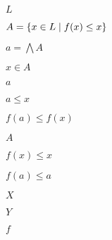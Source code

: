 \documentclass[10pt]{book}
\begin{document}
\begin{mdSnippets}
\begin{mdInlineSnippet}%
$L$\end{mdInlineSnippet}%
\begin{mdInlineSnippet}[a517cb183841eeec037a91ab4d1cf7f8]%
$A = \{x \in L \mid f(x) \leq x\}$\end{mdInlineSnippet}%
\begin{mdInlineSnippet}[a0248c5ed4fcf8c8688b4867ba675f8f]%
$a = \bigwedge A$\end{mdInlineSnippet}%
\begin{mdInlineSnippet}[15ba9457f86ec9a30bc9c1186628cce1]%
$x \in A$\end{mdInlineSnippet}%
\begin{mdInlineSnippet}[0cc175b9c0f1b6a831c399e269772661]%
$a$\end{mdInlineSnippet}%
\begin{mdInlineSnippet}[dea31c0ee5c3ad900ed1ee8811a0413d]%
$a \leq x$\end{mdInlineSnippet}%
\begin{mdInlineSnippet}[f9e1ab92d69f99be96ff37ad147f13ba]%
$f(a) \leq f(x)$\end{mdInlineSnippet}%
\begin{mdInlineSnippet}[7fc56270e7a70fa81a5935b72eacbe29]%
$A$\end{mdInlineSnippet}%
\begin{mdInlineSnippet}[63362f83cf87ffffbf28ae813d6d144d]%
$f(x) \leq x$\end{mdInlineSnippet}%
\begin{mdInlineSnippet}%
$f(a) \leq a$\end{mdInlineSnippet}%
\begin{mdInlineSnippet}[02129bb861061d1a052c592e2dc6b383]%
$X$\end{mdInlineSnippet}%
\begin{mdInlineSnippet}[57cec4137b614c87cb4e24a3d003a3e0]%
$Y$\end{mdInlineSnippet}%
\begin{mdInlineSnippet}%
$f$\end{mdInlineSnippet}%

\end{mdSnippets}
\end{document}
